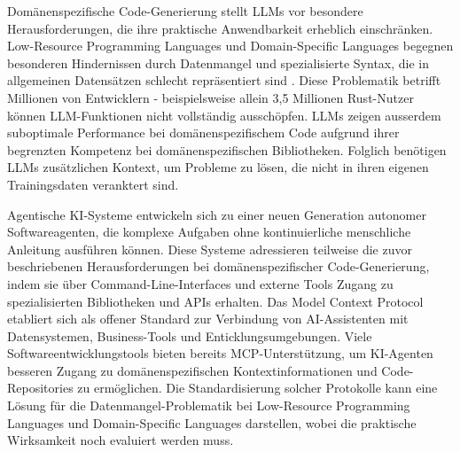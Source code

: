 Domänenspezifische Code-Generierung stellt LLMs vor besondere Herausforderungen,
die ihre praktische Anwendbarkeit erheblich einschränken. Low-Resource
Programming Languages und Domain-Specific Languages begegnen besonderen
Hindernissen durch Datenmangel und spezialisierte Syntax, die in allgemeinen
Datensätzen schlecht repräsentiert sind . Diese Problematik
betrifft Millionen von Entwicklern - beispielsweise allein 3,5 Millionen
Rust-Nutzer können LLM-Funktionen nicht vollständig ausschöpfen. LLMs zeigen
ausserdem suboptimale Performance bei domänenspezifischem Code aufgrund ihrer
begrenzten Kompetenz bei domänenspezifischen Bibliotheken. 
Folglich benötigen LLMs zusätzlichen Kontext, um Probleme zu lösen, die nicht in
ihren eigenen Trainingsdaten veranktert sind.

Agentische KI-Systeme entwickeln sich zu einer neuen Generation autonomer
Softwareagenten, die komplexe Aufgaben ohne kontinuierliche menschliche
Anleitung ausführen können. Diese Systeme adressieren teilweise die zuvor
beschriebenen Herausforderungen bei domänenspezifischer Code-Generierung, indem
sie über Command-Line-Interfaces und externe Tools Zugang zu spezialisierten
Bibliotheken und APIs erhalten. Das Model Context Protocol etabliert sich als
offener Standard zur Verbindung von AI-Assistenten mit Datensystemen,
Business-Tools und Enticklungsumgebungen.  Viele Softwareentwicklungstools
bieten bereits MCP-Unterstützung, um KI-Agenten besseren Zugang
zu domänenspezifischen Kontextinformationen und Code-Repositories zu
ermöglichen. Die Standardisierung solcher Protokolle kann eine Lösung für die
Datenmangel-Problematik bei Low-Resource Programming Languages und
Domain-Specific Languages darstellen, wobei die praktische Wirksamkeit noch
evaluiert werden muss.

